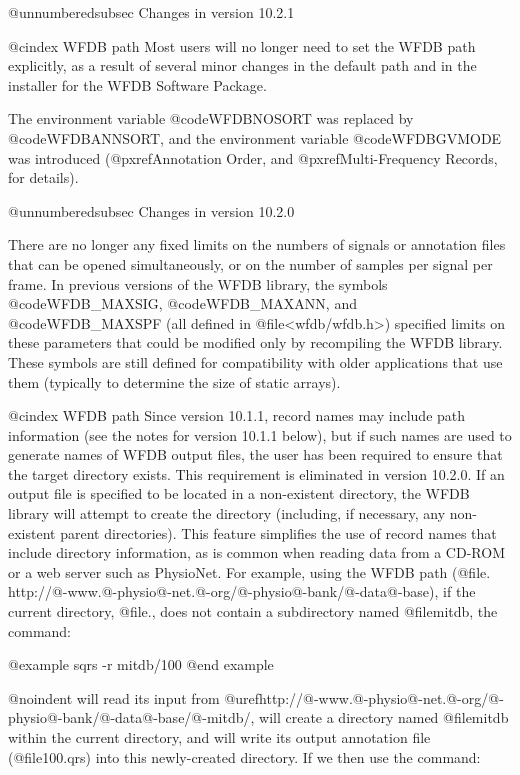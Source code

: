 @unnumberedsubsec Changes in version 10.2.1

@cindex WFDB path
Most users will no longer need to set the WFDB path explicitly, as a result
of several minor changes in the default path and in the installer for the
WFDB Software Package.

The environment variable @code{WFDBNOSORT} was replaced by @code{WFDBANNSORT},
and the environment variable @code{WFDBGVMODE} was introduced
(@pxref{Annotation Order}, and @pxref{Multi-Frequency Records}, for details).

@unnumberedsubsec Changes in version 10.2.0

There are no longer any fixed limits on the numbers of signals or annotation
files that can be opened simultaneously, or on the number of samples per signal
per frame.  In previous versions of the WFDB library, the symbols
@code{WFDB_MAXSIG}, @code{WFDB_MAXANN}, and @code{WFDB_MAXSPF} (all defined in
@file{<wfdb/wfdb.h>}) specified limits on these parameters that could be
modified only by recompiling the WFDB library.  These symbols are still defined
for compatibility with older applications that use them (typically to determine
the size of static arrays).

@cindex WFDB path
Since version 10.1.1, record names may include path information (see the notes
for version 10.1.1 below), but if such names are used to generate names of WFDB
output files, the user has been required to ensure that the target directory
exists.  This requirement is eliminated in version 10.2.0.  If an output file
is specified to be located in a non-existent directory, the WFDB library will
attempt to create the directory (including, if necessary, any non-existent
parent directories).  This feature simplifies the use of record names that
include directory information, as is common when reading data from a CD-ROM or
a web server such as PhysioNet.  For example, using the WFDB path
(@file{. http://@-www.@-physio@-net.@-org/@-physio@-bank/@-data@-base}), if the
current directory, @file{.}, does not contain a subdirectory named
@file{mitdb}, the command:

@example
sqrs -r mitdb/100
@end example

@noindent
will read its input from
@uref{http://@-www.@-physio@-net.@-org/@-physio@-bank/@-data@-base/@-mitdb/},
will create a directory named @file{mitdb} within the current directory, and
will write its output annotation file (@file{100.qrs}) into this newly-created
directory.  If we then use the command:

